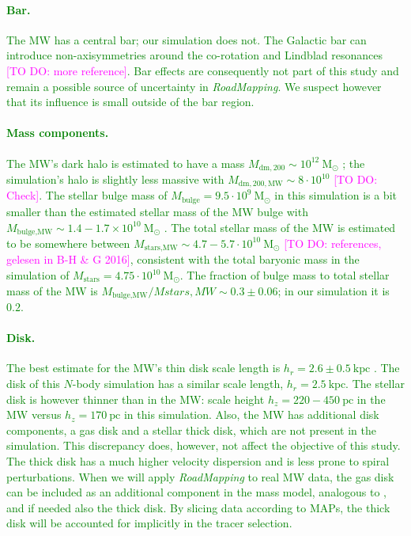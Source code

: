 \documentclass[iop,revtex4,numberedappendix,appendixfloats]{emulateapj}
\newcommand{\RM}{{\sl RoadMapping}}
\newcommand{\Wilma}[1]{\textcolor{Magenta}{#1}}
\newcommand{\NEW}[1]{\textcolor{Green}{#1}}
\begin{document}
\NEW{\paragraph{Bar.} The MW has a central bar; our simulation does not. The Galactic bar can introduce non-axisymmetries around the co-rotation and Lindblad resonances \citep{2000AJ....119..800D} \Wilma{[TO DO:  more reference]}. Bar effects are consequently not part of this study and remain a possible source of uncertainty  in \RM{}. We suspect however that its influence is small outside of the bar region.}

\NEW{\paragraph{Mass components.} The MW's dark halo is estimated to have a mass $M_{\text{dm},200}\sim10^{12}~\text{M}_\odot$ \citep{2016ARA&A..54..529B}; the simulation's halo is slightly less massive with $M_{\text{dm},200,\text{MW}}\sim8\cdot10^{10}$ \Wilma{[TO DO: Check]}. The stellar bulge mass of $M_\text{bulge}=9.5\cdot 10^9~\text{M}_\odot$ in this simulation is a bit smaller than the estimated stellar mass of the MW bulge with $M_\text{bulge,MW} \sim1.4-1.7 \times 10^{10}~\text{M}_\odot$ \citep{2015MNRAS.448..713P}. The total stellar mass of the MW is estimated to be somewhere between $M_\text{stars,MW}\sim4.7-5.7\cdot 10^{10}~  \text{M}_\odot$ \Wilma{[TO DO: references, gelesen in B-H \& G 2016]}, consistent with the total baryonic mass in the simulation of $M_\text{stars}=4.75\cdot10^{10}~  \text{M}_\odot$. The fraction of bulge mass to total stellar mass of the MW is $M_\text{bulge,MW}/M{stars,MW}\sim0.3\pm0.06$; in our simulation it is $0.2$.}

\NEW{\paragraph{Disk.} The best estimate for the MW's thin disk scale length is $h_r = 2.6 \pm 0.5~\text{kpc}$ \citep{2016ARA&A..54..529B}. The disk of this $N$-body simulation has a similar scale length, $h_r = 2.5~\text{kpc}$. The stellar disk is however thinner than in the MW: scale height $h_z=220-450~\text{pc}$ in the MW \citep{2016ARA&A..54..529B} versus $h_z=170~\text{pc}$ in this simulation. Also, the MW has additional disk components, a gas disk and a stellar thick disk, which are not present in the simulation. This discrepancy does, however, not affect the objective of this study. The thick disk has a much higher velocity dispersion and is less prone to spiral perturbations. When we will apply \RM{} to real MW data, the gas disk can be included as an additional component in the mass model, analogous to \citet{2013ApJ...779..115B}, and if needed also the thick disk. By slicing data according to MAPs, the thick disk will be accounted for implicitly in the tracer selection.}
\end{document}
